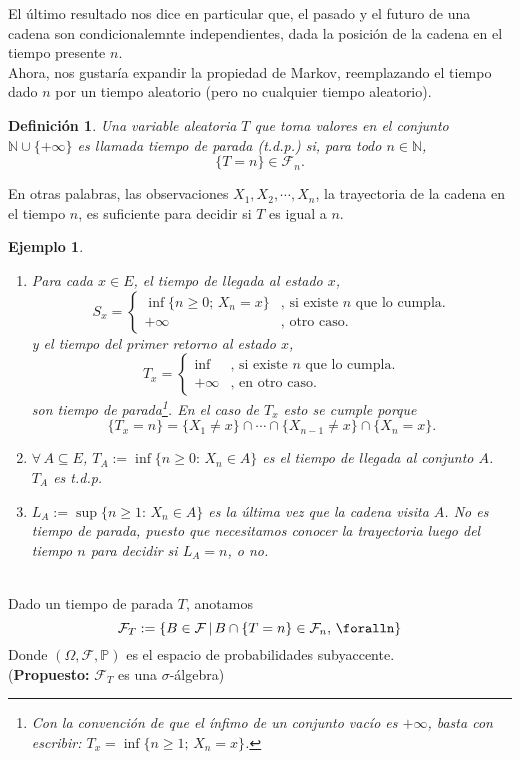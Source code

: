 \documentclass[a4paper]{article}
\newcommand{\prob}{\mathbb{P}}
\newtheorem{definicion}{Definición}
\newtheorem{ejemplo}{Ejemplo}
\numberwithin{equation}{subsection}
\def\N{\mathbb N}
\begin{document}
El último resultado nos dice en particular que, el pasado y el futuro de una cadena son condicionalemnte independientes, dada la posición de la cadena en el tiempo presente $n$.\\ Ahora, nos gustaría expandir la propiedad de Markov, reemplazando el tiempo dado $n$ por un tiempo aleatorio (pero no cualquier tiempo aleatorio).

\begin{definicion}
Una variable aleatoria $T$ que toma valores en el conjunto $\N\cup \{+\infty\}$ es llamada tiempo de parada (t.d.p.) si, para todo $n\in \N$,
\[\{T=n\} \in \mathcal{F}_n.\]
\end{definicion}
En otras palabras, las observaciones $X_1,X_2,\cdots,X_n$, la trayectoria de la cadena en el tiempo $n$, es suficiente para decidir si $T$ es igual a $n$.

\begin{ejemplo}
    \begin{enumerate}
        \item Para cada $x\in E$, el tiempo de llegada al estado $x$,
        \[S_x = \begin{cases}
        \inf\{n\geq0;\,X_n=x\} & \text{, si existe $n$ que lo cumpla.}\\
        +\infty & \text{, otro caso.}
        \end{cases}\]
        y el tiempo del primer retorno al estado $x$,
        \[T_x = \begin{cases}
        \inf\ & \text{, si existe $n$ que lo cumpla.}\\
        +\infty & \text{, en otro caso.}
        \end{cases}\]
        son tiempo de parada\footnote{Con la convención de que el ínfimo de un conjunto vacío es $+\infty$, basta con escribir: $T_x = \inf\{n\geq 1;\,X_n=x\}$.}. En el caso de $T_x$ esto se cumple porque
        \[\{T_x = n\} = \{X_1\neq x\}\cap \cdots \cap \{X_{n-1}\neq x\}\cap\{X_n = x\}.\]
        \item $\forall\,A\subseteq E$, $T_A := \inf\{n\geq 0:\,X_n\in A\}$ es el tiempo de llegada al conjunto $A$. $T_A$ es t.d.p.
        \item $L_A:= \sup\{n\geq 1:\,X_n\in A\}$ es la última vez que  la cadena visita $A$. No es tiempo de parada, puesto que necesitamos conocer la trayectoria luego del tiempo $n$ para decidir si $L_A = n$, o no.
    \end{enumerate}
\end{ejemplo}\\ \newline \newline
Dado un tiempo de parada $T$, anotamos
\[\mathcal{F}_T := \{B \in \mathcal{F}\,|\,B\cap \{T=n\} \in \mathcal{F}_n,\, \foralln\}\]
Donde $\left(\Omega,\mathcal{F},\prob\right)$ es el espacio de probabilidades subyaccente.\\ (\textbf{Propuesto: }$\mathcal{F}_T$ es una $\sigma$-álgebra)
\end{document}
